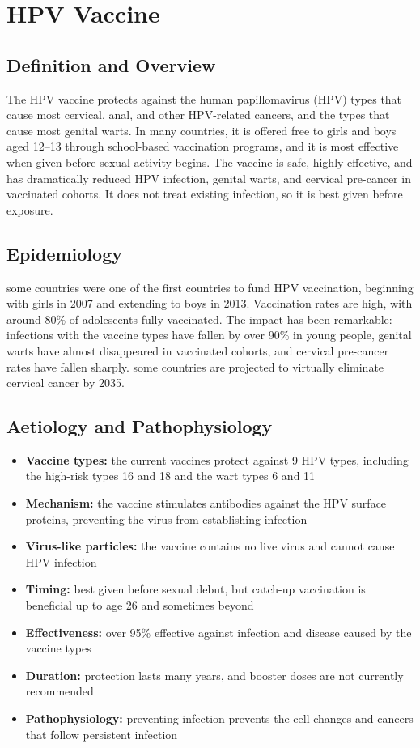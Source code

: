 \chapter{HPV Vaccine}

\section*{Definition and Overview}
The HPV vaccine protects against the human papillomavirus (HPV) types that cause most cervical, anal, and other HPV-related cancers, and the types that cause most genital warts. In many countries, it is offered free to girls and boys aged 12--13 through school-based vaccination programs, and it is most effective when given before sexual activity begins. The vaccine is safe, highly effective, and has dramatically reduced HPV infection, genital warts, and cervical pre-cancer in vaccinated cohorts. It does not treat existing infection, so it is best given before exposure.

\section*{Epidemiology}
some countries were one of the first countries to fund HPV vaccination, beginning with girls in 2007 and extending to boys in 2013. Vaccination rates are high, with around 80\% of adolescents fully vaccinated. The impact has been remarkable: infections with the vaccine types have fallen by over 90\% in young people, genital warts have almost disappeared in vaccinated cohorts, and cervical pre-cancer rates have fallen sharply. some countries are projected to virtually eliminate cervical cancer by 2035.

\section*{Aetiology and Pathophysiology}
\begin{itemize}
    \item \textbf{Vaccine types:} the current vaccines protect against 9 HPV types, including the high-risk types 16 and 18 and the wart types 6 and 11
    \item \textbf{Mechanism:} the vaccine stimulates antibodies against the HPV surface proteins, preventing the virus from establishing infection
    \item \textbf{Virus-like particles:} the vaccine contains no live virus and cannot cause HPV infection
    \item \textbf{Timing:} best given before sexual debut, but catch-up vaccination is beneficial up to age 26 and sometimes beyond
    \item \textbf{Effectiveness:} over 95\% effective against infection and disease caused by the vaccine types
    \item \textbf{Duration:} protection lasts many years, and booster doses are not currently recommended
    \item \textbf{Pathophysiology:} preventing infection prevents the cell changes and cancers that follow persistent infection
\end{itemize}

